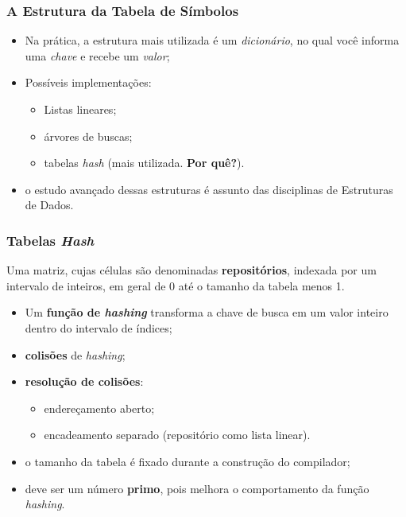 \documentclass[table]{beamer}
\begin{document}
\begin{frame}
   \frametitle{A Estrutura da Tabela de Símbolos}
   \begin{itemize}
      \item Na prática, a estrutura mais utilizada é um \textit{dicionário}, no qual você informa uma \textit{chave} e recebe um \textit{valor};
      \item Possíveis implementações:
      \begin{itemize}
         \item Listas lineares;
	 \item árvores de buscas;
	 \item tabelas \textit{hash} (mais utilizada. \textbf{Por quê?}).
      \end{itemize}
      \item o estudo avançado dessas estruturas é assunto das disciplinas de Estruturas de Dados.
   \end{itemize}
\end{frame}

\begin{frame}
   \frametitle{Tabelas \textit{Hash}}
   Uma matriz, cujas células são denominadas \textbf{repositórios}, indexada por um intervalo de inteiros, em geral de 0 até o tamanho da tabela menos 1.
   \begin{itemize}
      \item Um \textbf{função de \textit{hashing}} transforma a chave de busca em um valor inteiro dentro do intervalo de índices;
      \item \textbf{colisões} de \textit{hashing};
      \item \textbf{resolução de colisões}:
      \begin{itemize}
         \item endereçamento aberto;
	 \item encadeamento separado (repositório como lista linear).
      \end{itemize}
      \item o tamanho da tabela é fixado durante a construção do compilador;
      \item deve ser um número \textbf{primo}, pois melhora o comportamento da função \textit{hashing}.
   \end{itemize}
\end{frame}
\end{document}
